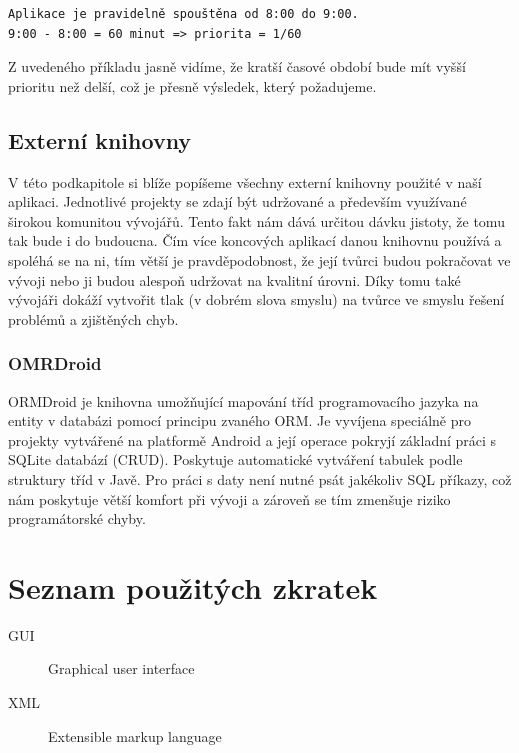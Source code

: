 \documentclass[thesis=M,czech]{FITthesis}[2012/06/26]
\begin{document}
\begin{verbatim}
Aplikace je pravidelně spouštěna od 8:00 do 9:00.
9:00 - 8:00 = 60 minut => priorita = 1/60
\end{verbatim}

Z uvedeného příkladu jasně vidíme, že kratší časové období bude mít vyšší prioritu než delší, což je přesně výsledek, který požadujeme.

\section{Externí knihovny}
V této podkapitole si blíže popíšeme všechny externí knihovny použité v naší aplikaci. Jednotlivé projekty se zdají být udržované a především využívané širokou komunitou vývojářů. Tento fakt nám dává určitou dávku jistoty, že tomu tak bude i do budoucna. Čím více koncových aplikací danou knihovnu používá a spoléhá se na ni, tím větší je pravděpodobnost, že její tvůrci budou pokračovat ve vývoji nebo ji budou alespoň udržovat na kvalitní úrovni. Díky tomu také vývojáři dokáží vytvořit tlak (v dobrém slova smyslu) na tvůrce ve smyslu řešení problémů a zjištěných chyb.

\subsection{OMRDroid}\label{ormdroid}
ORMDroid je knihovna umožňující mapování tříd programovacího jazyka na entity v databázi pomocí principu zvaného ORM. Je vyvíjena speciálně pro projekty vytvářené na platformě Android a její operace pokryjí základní práci s SQLite databází (CRUD). Poskytuje automatické vytváření tabulek podle struktury tříd v Javě. Pro práci s daty není nutné psát jakékoliv SQL příkazy, což nám poskytuje větší komfort při vývoji a zároveň se tím zmenšuje riziko programátorské chyby.

\begin{conclusion}
\end{conclusion}




\appendix

\chapter{Seznam použitých zkratek}
\begin{description}
	\item[GUI] Graphical user interface
	\item[XML] Extensible markup language
\end{description}
\end{document}
